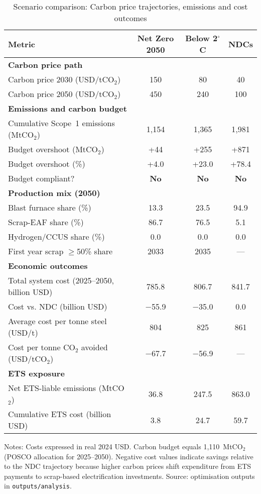 \begin{table}[ht]
  \centering
  \caption{Scenario comparison: Carbon price trajectories, emissions and cost outcomes}
  \label{tab:scenario-comparison}
  \begin{threeparttable}
  \begin{tabular}{@{}lccc@{}}
    \toprule
    Metric & Net Zero 2050 & Below 2$^\circ$C & NDCs \\
    \midrule
    \multicolumn{4}{l}{\textbf{Carbon price path}} \\
    Carbon price 2030 (USD/tCO$_2$) & 150 & 80 & 40 \\
    Carbon price 2050 (USD/tCO$_2$) & 450 & 240 & 100 \\
    \midrule
    \multicolumn{4}{l}{\textbf{Emissions and carbon budget}} \\
    Cumulative Scope~1 emissions (MtCO$_2$) & 1{,}154 & 1{,}365 & 1{,}981 \\
    Budget overshoot (MtCO$_2$) & +44 & +255 & +871 \\
    Budget overshoot (\%) & +4.0 & +23.0 & +78.4 \\
    Budget compliant? & \textbf{No} & \textbf{No} & \textbf{No} \\
    \midrule
    \multicolumn{4}{l}{\textbf{Production mix (2050)}} \\
    Blast furnace share (\%) & 13.3 & 23.5 & 94.9 \\
    Scrap-EAF share (\%) & 86.7 & 76.5 & 5.1 \\
    Hydrogen/CCUS share (\%) & 0.0 & 0.0 & 0.0 \\
    First year scrap $\ge$50\% share & 2033 & 2035 & --- \\
    \midrule
    \multicolumn{4}{l}{\textbf{Economic outcomes}} \\
    Total system cost (2025--2050, billion USD) & 785.8 & 806.7 & 841.7 \\
    Cost vs. NDC (billion USD) & $-$55.9 & $-$35.0 & 0.0 \\
    Average cost per tonne steel (USD/t) & 804 & 825 & 861 \\
    Cost per tonne CO$_2$ avoided (USD/tCO$_2$) & $-$67.7 & $-$56.9 & --- \\
    \midrule
    \multicolumn{4}{l}{\textbf{ETS exposure}} \\
    Net ETS-liable emissions (MtCO$_2$) & 36.8 & 247.5 & 863.0 \\
    Cumulative ETS cost (billion USD) & 3.8 & 24.7 & 59.7 \\
    \bottomrule
  \end{tabular}
  \begin{tablenotes}
    \footnotesize
    \item Notes: Costs expressed in real 2024 USD. Carbon budget equals 1{,}110~MtCO$_2$ (POSCO allocation for 2025--2050). Negative cost values indicate savings relative to the NDC trajectory because higher carbon prices shift expenditure from ETS payments to scrap-based electrification investments. Source: optimisation outputs in \texttt{outputs/analysis}.
  \end{tablenotes}
  \end{threeparttable}
\end{table}

